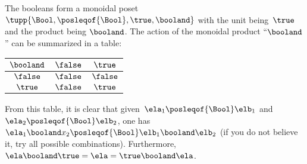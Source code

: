 \begin{example}
	The booleans form a monoidal poset $\tupp{\Bool,\posleqof{\Bool},\true,\booland}$
	with the unit being~$\true$ and the product being $\booland$.
	The action of the monoidal product ``$\booland$'' can be summarized in a table:
	\begin{center}
		\begin{tabular}{c|cc}
			$\booland$ & $\false$ & $\true$  \\
			\hline
			$\false$   & $\false$ & $\false$ \\
			$\true$    & $\false$ & $\true$
		\end{tabular}
	\end{center}
	From this table, it is clear that given~$\ela_1\posleqof{\Bool}\elb_1$ and~$\ela_2\posleqof{\Bool} \elb_2$, one has~$\ela_1\booland x_2\posleqof{\Bool} \elb_1\booland \elb_2$ (if you do not believe it, try all possible combinations).
	Furthermore,~$\ela\booland \true=\ela=\true \booland \ela$.
\end{example}

